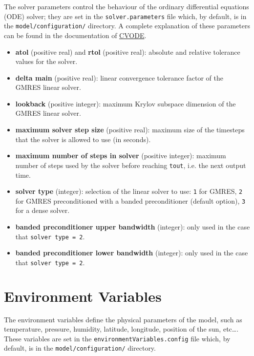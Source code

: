 The solver parameters control the behaviour of the ordinary
differential equations (ODE) solver; they are set in the
\texttt{solver.parameters} file which, by default, is in the
\texttt{model/configuration/} directory. A complete explanation of
these parameters can be found in the documentation of
\href{https://computation.llnl.gov/projects/sundials/sundials-software}{CVODE}.

\begin{itemize}
\item \textbf{atol} (positive real) and \textbf{rtol} (positive real):
  absolute and relative tolerance values for the solver.
\item \textbf{delta main} (positive real): linear convergence
  tolerance factor of the GMRES linear solver.
\item \textbf{lookback} (positive integer): maximum Krylov subspace
  dimension of the GMRES linear solver.
\item \textbf{maximum solver step size} (positive real): maximum size
  of the timesteps that the solver is allowed to use (in seconds).
\item \textbf{maximum number of steps in solver} (positive integer):
  maximum number of steps used by the solver before reaching
  \texttt{tout}, i.e. the next output time.
\item \textbf{solver type} (integer): selection of the linear solver
  to use: \texttt{1} for GMRES, \texttt{2} for GMRES preconditioned
  with a banded preconditioner (default option), \texttt{3} for a
  dense solver.
\item \textbf{banded preconditioner upper bandwidth} (integer): only
  used in the case that \texttt{solver\ type\ =\ 2}.
\item \textbf{banded preconditioner lower bandwidth} (integer): only
  used in the case that \texttt{solver\ type\ =\ 2}.
\end{itemize}

\section{Environment Variables} \label{sec:environment-variables}

The environment variables define the physical parameters of the model,
such as temperature, pressure, humidity, latitude, longitude, position
of the sun, etc\ldots. These variables are set in the
\texttt{environmentVariables.config} file which, by default, is in the
\texttt{model/configuration/} directory.

